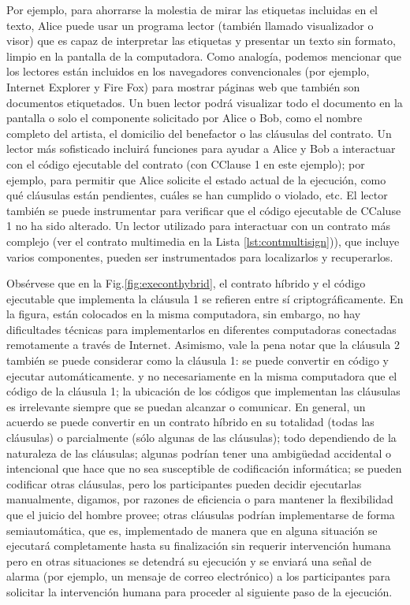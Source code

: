 \documentclass[12pt]{report} %
\begin{document}
Por ejemplo, para ahorrarse la molestia de mirar las etiquetas incluidas en el texto, Alice puede usar un programa lector (también llamado visualizador o visor) que es capaz de interpretar las etiquetas y presentar un texto sin formato, limpio en la pantalla de la computadora. Como analogía, podemos mencionar que los lectores están incluidos en los navegadores convencionales (por ejemplo, Internet Explorer y Fire Fox) para mostrar páginas web que también son documentos etiquetados. Un buen lector podrá visualizar todo el documento en la pantalla o solo el componente solicitado por Alice o Bob, como el nombre completo del artista, el domicilio del benefactor o las cláusulas del contrato. Un lector más sofisticado incluirá funciones para ayudar a Alice y Bob a interactuar con el código ejecutable del contrato (con CClause 1 en este ejemplo); por ejemplo, para permitir que Alice solicite el estado actual de la ejecución, como qué cláusulas están pendientes, cuáles se han cumplido o violado, etc.  El lector también se puede instrumentar para verificar que el código ejecutable de CCaluse 1 no ha sido alterado. Un lector utilizado para interactuar con un contrato más complejo (ver el contrato multimedia en la Lista \ref{lst:contmultisign})), que incluye varios componentes, pueden ser instrumentados para localizarlos y recuperarlos.



Obsérvese que en la Fig.\ref{fig:execonthybrid},  el contrato híbrido y el código ejecutable que implementa la cláusula 1 se refieren entre sí criptográficamente. En la figura, están colocados en la misma computadora, sin embargo, no hay dificultades técnicas para implementarlos en diferentes computadoras conectadas remotamente a través de Internet. Asimismo, vale la pena notar que la cláusula 2 también se puede considerar como la cláusula 1: se puede convertir en código y ejecutar automáticamente. y no necesariamente en la misma computadora que el código de la cláusula 1; la ubicación de los códigos que implementan las cláusulas es irrelevante siempre que se puedan alcanzar o comunicar. En general, un acuerdo se puede convertir en un contrato híbrido en su totalidad (todas las cláusulas) o parcialmente (sólo algunas de las cláusulas); todo dependiendo de la naturaleza de las cláusulas; algunas podrían tener una ambigüedad accidental o intencional que hace que no sea susceptible de codificación informática; se pueden codificar otras cláusulas, pero los participantes pueden decidir ejecutarlas manualmente, digamos, por razones de eficiencia o para mantener la flexibilidad que el juicio del hombre provee; otras cláusulas podrían implementarse de forma semiautomática, que es, implementado de manera que en alguna situación se ejecutará completamente hasta su finalización sin requerir intervención humana pero en otras situaciones se detendrá su ejecución y se enviará una señal de alarma (por ejemplo, un mensaje de correo electrónico) a los participantes para solicitar la intervención humana para proceder al siguiente paso de la ejecución.
\end{document}
